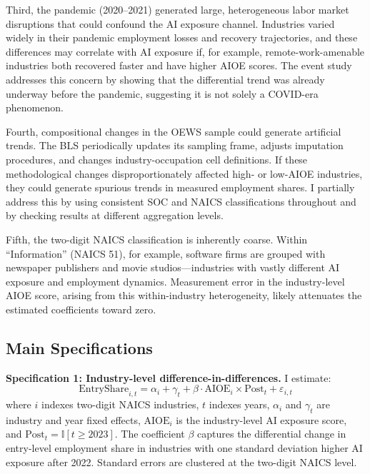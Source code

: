\documentclass[12pt]{article}
\newcommand{\ind}{\mathbb{I}}
\begin{document}
Third, the pandemic (2020--2021) generated large, heterogeneous labor market disruptions that could confound the AI exposure channel. Industries varied widely in their pandemic employment losses and recovery trajectories, and these differences may correlate with AI exposure if, for example, remote-work-amenable industries both recovered faster and have higher AIOE scores. The event study addresses this concern by showing that the differential trend was already underway before the pandemic, suggesting it is not solely a COVID-era phenomenon.

Fourth, compositional changes in the OEWS sample could generate artificial trends. The BLS periodically updates its sampling frame, adjusts imputation procedures, and changes industry-occupation cell definitions. If these methodological changes disproportionately affected high- or low-AIOE industries, they could generate spurious trends in measured employment shares. I partially address this by using consistent SOC and NAICS classifications throughout and by checking results at different aggregation levels.

Fifth, the two-digit NAICS classification is inherently coarse. Within ``Information'' (NAICS 51), for example, software firms are grouped with newspaper publishers and movie studios---industries with vastly different AI exposure and employment dynamics. Measurement error in the industry-level AIOE score, arising from this within-industry heterogeneity, likely attenuates the estimated coefficients toward zero.

\subsection{Main Specifications}

\textbf{Specification 1: Industry-level difference-in-differences.} I estimate:
\begin{equation}
\text{EntryShare}_{i,t} = \alpha_i + \gamma_t + \beta \cdot \text{AIOE}_i \times \text{Post}_t + \varepsilon_{i,t}
\label{eq:did}
\end{equation}
where $i$ indexes two-digit NAICS industries, $t$ indexes years, $\alpha_i$ and $\gamma_t$ are industry and year fixed effects, $\text{AIOE}_i$ is the industry-level AI exposure score, and $\text{Post}_t = \ind[t \geq 2023]$. The coefficient $\beta$ captures the differential change in entry-level employment share in industries with one standard deviation higher AI exposure after 2022. Standard errors are clustered at the two-digit NAICS level.
\end{document}
